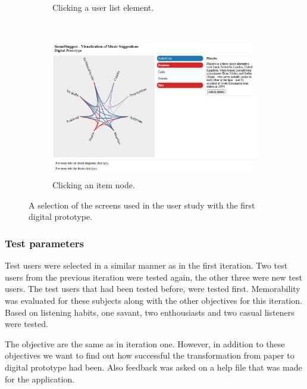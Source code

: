\begin{figure}
\begin{subfigure}[t]{0.3\textwidth}
					\caption{Clicking a user list element.}
					\label{figure:prototype_soundsuggest1_user_click}
	\end{subfigure}
	~
	\begin{subfigure}[t]{0.3\textwidth}
					\centering
					\includegraphics[width=\textwidth]{img/prototype_soundsuggest1_item_click}
					\caption{Clicking an item node.}
					\label{figure:prototype_soundsuggest1_item_click}
	\end{subfigure}
	\caption{A selection of the screens used in the user study with the first digital prototype.}%
	\label{figure:prototype_soundsuggest1}%
\end{figure}



\subsubsection{Test parameters}\label{chapter:prototype:section:soundsuggest1:setup}

Test users were selected in a similar manner as in the first iteration. Two test users from the previous iteration were tested again, the other three were new test users. The test users that had been tested before, were tested first. Memorability was evaluated for these subjects along with the other objectives for this iteration. Based on listening habits, one savant, two enthousiasts and two casual listeners were tested.

The objective are the same as in iteration one. However, in addition to these objectives we want to find out how successful the transformation from paper to digital prototype had been. Also feedback was asked on a help file that was made for the application.

